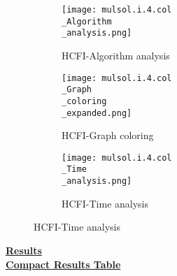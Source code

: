 \documentclass[10pt]{article}
\begin{document}
\graphicspath{{./Core1/Solutions/HCFI/mulsol.i.4.col}}
\begin{figure}[H]
\begin{subfigure}{.33\textwidth}
  \centering
  \texttt{[image: mulsol.i.4.col\\\_Algorithm\\\_analysis.png]}
  \caption{HCFI-Algorithm analysis}
   \label{fig:subfig1}
\end{subfigure}%
\begin{subfigure}{.33\textwidth}
  \centering
  \texttt{[image: mulsol.i.4.col\\\_Graph\\\_coloring\\\_expanded.png]}
  \caption{HCFI-Graph coloring}
  \label{fig:subfig2}
\end{subfigure}
\begin{subfigure}{.33\textwidth}
  \centering
  \texttt{[image: mulsol.i.4.col\\\_Time\\\_analysis.png]}
  \caption{HCFI-Time analysis}
  \end{subfigure}
\end{figure}
\vspace{2cm}
\begin{center}
\hyperlink{page.8}{\textbf{Results}}\\
\vspace{0.5cm}
\hyperlink{page.71}{\textbf{Compact Results Table}}
\end{center}
\pagebreak
\end{document}
